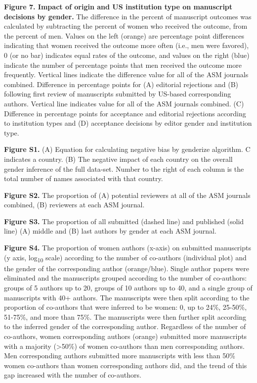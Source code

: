 \documentclass[11pt,]{article}
\begin{document}
\textbf{Figure 7. Impact of origin and US institution type on manuscript
decisions by gender.} The difference in the percent of manuscript
outcomes was calculated by subtracting the percent of women who received
the outcome, from the percent of men. Values on the left (orange) are
percentage point differences indicating that women received the outcome
more often (i.e., men were favored), 0 (or no bar) indicates equal rates
of the outcome, and values on the right (blue) indicate the number of
percentage points that men received the outcome more frequently.
Vertical lines indicate the difference value for all of the ASM journals
combined. Difference in percentage points for (A) editorial rejections
and (B) following first review of manuscripts submitted by US-based
corresponding authors. Vertical line indicates value for all of the ASM
journals combined. (C) Difference in percentage points for acceptance
and editorial rejections according to institution types and (D)
acceptance decisions by editor gender and institution type.

\textbf{Figure S1.} (A) Equation for calculating negative bias by
genderize algorithm. C indicates a country. (B) The negative impact of
each country on the overall gender inference of the full data-set.
Number to the right of each column is the total number of names
associated with that country.

\textbf{Figure S2.} The proportion of (A) potential reviewers at all of
the ASM journals combined, (B) reviewers at each ASM journal.

\textbf{Figure S3.} The proportion of all submitted (dashed line) and
published (solid line) (A) middle and (B) last authors by gender at each
ASM journal.

\textbf{Figure S4.} The proportion of women authors (x-axis) on
submitted manuscripts (y axis, log\textsubscript{10} scale) according to
the number of co-authors (individual plot) and the gender of the
corresponding author (orange/blue). Single author papers were eliminated
and the manuscripts grouped according to the number of co-authors:
groups of 5 authors up to 20, groups of 10 authors up to 40, and a
single group of manuscripts with 40+ authors. The manuscripts were then
split according to the proportion of co-authors that were inferred to be
women: 0, up to 24\%, 25-50\%, 51-75\%, and more than 75\%. The
manuscripts were then further split according to the inferred gender of
the corresponding author. Regardless of the number of co-authors, women
corresponding authors (orange) submitted more manuscripts with a
majority (\textgreater50\%) of women co-authors than men corresponding
authors. Men corresponding authors submitted more manuscripts with less
than 50\% women co-authors than women corresponding authors did, and the
trend of this gap increased with the number of co-authors.
\end{document}
